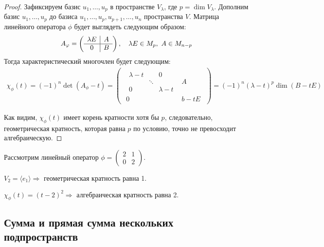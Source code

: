 \begin{proof}
	Зафиксируем базис $u_1, \ldots, u_p$ в пространстве $V_\lambda$, где $p = \dim{V_\lambda}$. Дополним базис $u_1, \ldots, u_p$ до базиса $u_1, \ldots, u_p, u_{p+1}, \ldots, u_n$ пространства $V$. Матрица линейного оператора $\phi$ будет выглядеть следующим образом:
	\begin{gather*}
	A_\phi = 
		\begin{pmatrix*}
		\begin{array}{c|c}
		\l E & A \\ \hline
		0 & B
		\end{array}
		\end{pmatrix*}, \quad \lambda E \in M_p,\ A \in M_{n-p}
	\end{gather*}
	Тогда характеристический многочлен будет следующим:
	\begin{gather*}
	\chi_\phi(t) = (-1)^n \det (A_\phi - t) = 
	\begin{pmatrix}
	\begin{array}{c|c}
	\begin{matrix}
	\lambda - t &  & 0 \\
	& \ddots &  \\
	0 &  & \lambda - t
	\end{matrix}
	& A \\ \hline
	0 & b - tE
	\end{array}
	\end{pmatrix}
	= (-1)^n(\lambda - t)^p\dim(B - tE)
	\end{gather*}

	Как видим, $\chi_\phi(t)$ имеет корень кратности хотя бы $p$, следовательно, геометрическая кратность, которая равна $p$ по условию, точно не превосходит алгебраическую.
\end{proof}

\begin{Examples} Рассмотрим линейный оператор $\phi = \begin{pmatrix}
    2& 1 \\
    0& 2
    \end{pmatrix}$.

    $V_2 = \langle e_1\rangle \Rightarrow$ геометрическая кратность равна 1.

    $\chi_\phi(t) = (t-2)^2 \Rightarrow$ алгебраическая кратность равна 2.
\end{Examples}

\subsection*{Сумма и прямая сумма нескольких подпространств}

